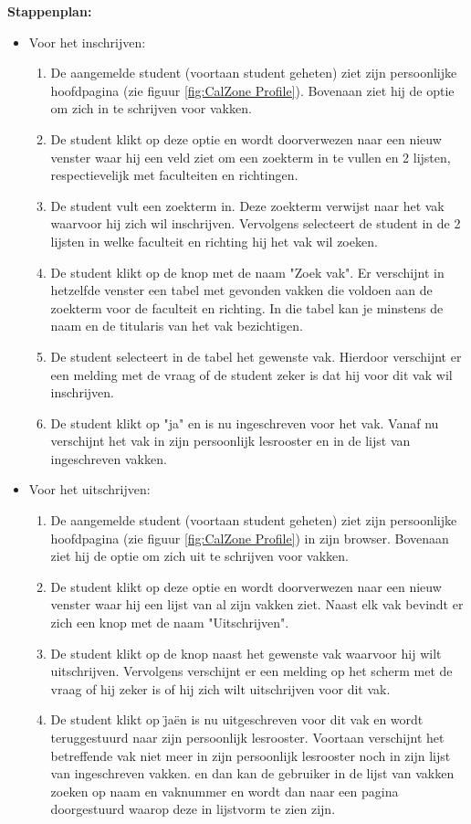 \textbf{Stappenplan:}
\begin{itemize}
\item Voor het inschrijven:
	\begin{enumerate}
	\item De aangemelde student (voortaan student geheten) ziet zijn persoonlijke hoofdpagina (zie figuur \ref{fig:CalZone Profile}). Bovenaan ziet hij de optie om zich in te schrijven voor vakken.
	\item De student klikt op deze optie en wordt doorverwezen naar een nieuw venster waar hij een veld ziet om een zoekterm in te vullen en 2 lijsten, respectievelijk met faculteiten en richtingen.
	\item De student vult een zoekterm in. Deze zoekterm verwijst naar het vak waarvoor hij zich wil inschrijven. Vervolgens selecteert de student in de 2 lijsten in welke faculteit en richting hij het vak wil zoeken.
	\item De student klikt op de knop met de naam "Zoek vak". Er verschijnt in hetzelfde venster een tabel met gevonden vakken die voldoen aan de zoekterm voor de faculteit en richting. In die tabel kan je minstens de naam en de titularis van het vak bezichtigen.
	\item De student selecteert in de tabel het gewenste vak. Hierdoor verschijnt er een melding met de vraag of de student zeker is dat hij voor dit vak wil inschrijven.
	\item De student klikt op "ja" en is nu ingeschreven voor het vak. Vanaf nu verschijnt het vak in zijn persoonlijk lesrooster en in de lijst van ingeschreven vakken.
	\end{enumerate}
	
\item Voor het uitschrijven:
	\begin{enumerate}
	\item De aangemelde student (voortaan student geheten) ziet zijn persoonlijke hoofdpagina (zie figuur \ref{fig:CalZone Profile}) in zijn browser. Bovenaan ziet hij de optie om zich uit te schrijven voor vakken.
	\item De student klikt op deze optie en wordt doorverwezen naar een nieuw venster waar hij een lijst van al zijn vakken ziet. Naast elk vak bevindt er zich een knop met de naam "Uitschrijven".
	\item De student klikt op de knop naast het gewenste vak waarvoor hij wilt uitschrijven. Vervolgens verschijnt er een melding op het scherm met de vraag of hij zeker is of hij zich wilt uitschrijven voor dit vak.
	\item De student klikt op \"ja\" en is nu uitgeschreven voor dit vak en wordt teruggestuurd naar zijn persoonlijk lesrooster. Voortaan verschijnt het betreffende vak niet meer in zijn persoonlijk lesrooster noch in zijn lijst van ingeschreven vakken. en dan kan de gebruiker in de lijst van vakken zoeken op naam en vaknummer en wordt dan naar een pagina doorgestuurd waarop deze in lijstvorm te zien zijn.
	\end{enumerate}
\end{itemize}

